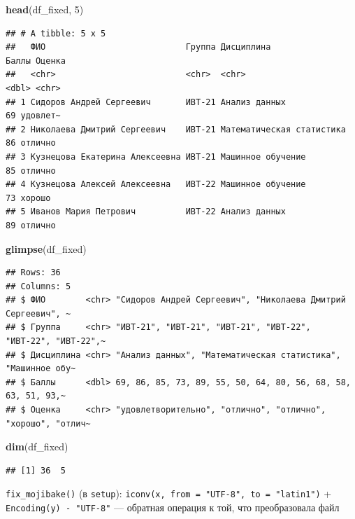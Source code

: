 \documentclass[
]{article}
\newenvironment{Shaded}{\begin{snugshade}}{\end{snugshade}}
\newcommand{\DecValTok}[1]{\textcolor[rgb]{0.00,0.00,0.81}{#1}}
\newcommand{\FunctionTok}[1]{\textcolor[rgb]{0.13,0.29,0.53}{\textbf{#1}}}
\newcommand{\NormalTok}[1]{#1}
\begin{document}
\begin{Shaded}
\begin{Highlighting}[]
\FunctionTok{head}\NormalTok{(df\_fixed, }\DecValTok{5}\NormalTok{)}
\end{Highlighting}
\end{Shaded}

\begin{verbatim}
## # A tibble: 5 x 5
##   ФИО                            Группа Дисциплина                Баллы Оценка  
##   <chr>                          <chr>  <chr>                     <dbl> <chr>   
## 1 Сидоров Андрей Сергеевич       ИВТ-21 Анализ данных                69 удовлет~
## 2 Николаева Дмитрий Сергеевич    ИВТ-21 Математическая статистика    86 отлично 
## 3 Кузнецова Екатерина Алексеевна ИВТ-21 Машинное обучение            85 отлично 
## 4 Кузнецова Алексей Алексеевна   ИВТ-22 Машинное обучение            73 хорошо  
## 5 Иванов Мария Петрович          ИВТ-22 Анализ данных                89 отлично
\end{verbatim}

\begin{Shaded}
\begin{Highlighting}[]
\FunctionTok{glimpse}\NormalTok{(df\_fixed)}
\end{Highlighting}
\end{Shaded}

\begin{verbatim}
## Rows: 36
## Columns: 5
## $ ФИО        <chr> "Сидоров Андрей Сергеевич", "Николаева Дмитрий Сергеевич", ~
## $ Группа     <chr> "ИВТ-21", "ИВТ-21", "ИВТ-21", "ИВТ-22", "ИВТ-22", "ИВТ-22",~
## $ Дисциплина <chr> "Анализ данных", "Математическая статистика", "Машинное обу~
## $ Баллы      <dbl> 69, 86, 85, 73, 89, 55, 50, 64, 80, 56, 68, 58, 63, 51, 93,~
## $ Оценка     <chr> "удовлетворительно", "отлично", "отлично", "хорошо", "отлич~
\end{verbatim}

\begin{Shaded}
\begin{Highlighting}[]
\FunctionTok{dim}\NormalTok{(df\_fixed)}
\end{Highlighting}
\end{Shaded}

\begin{verbatim}
## [1] 36  5
\end{verbatim}

\texttt{fix\_mojibake()} (в \texttt{setup}):
\texttt{iconv(x,\ from\ =\ "UTF-8",\ to\ =\ "latin1")} +
\texttt{Encoding(y)\ -\ "UTF-8"} --- обратная операция к той, что
преобразовала файл
\end{document}
